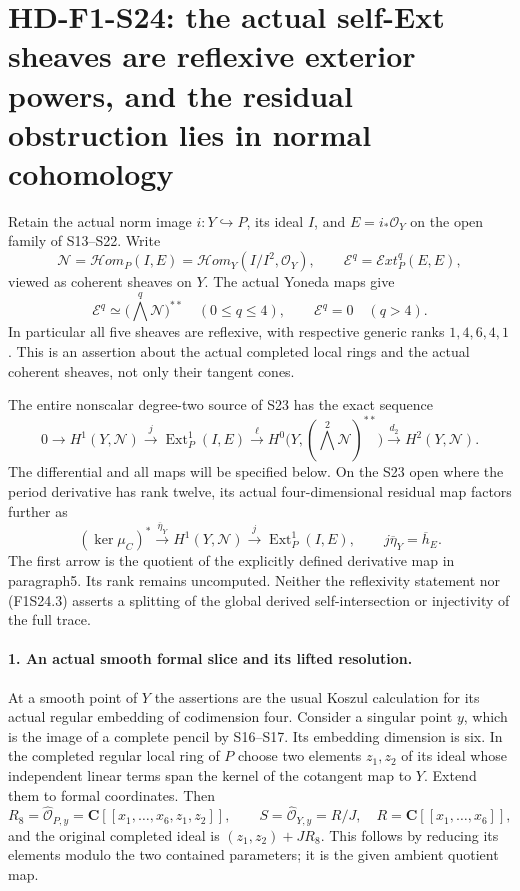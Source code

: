 \section[HD-F1-S24: reflexive local Ext and the actual normal obstruction]{HD-F1-S24: the actual self-Ext sheaves are reflexive exterior powers, and the residual obstruction lies in normal cohomology}
\label{sec:f1-norm-fourfold-reflexive-ext}

Retain the actual norm image $i:Y\hookrightarrow P$, its ideal $I$,
and $E=i_*\mathcal O_Y$ on the open family of S13--S22. Write
\[
 \mathscr N=\mathcal Hom_P(I,E)
       =\mathcal Hom_Y(I/I^2,\mathcal O_Y),\qquad
 \mathscr E^q=\mathcal Ext_P^q(E,E),
 \tag{F1S24.1}
\]
viewed as coherent sheaves on $Y$. The actual Yoneda maps give
\[
 \mathscr E^q\simeq\bigl(\textstyle\bigwedge^q\mathscr N\bigr)^{**}
       \quad(0\le q\le4),\qquad
 \mathscr E^q=0\quad(q>4).
 \tag{F1S24.2}
\]
In particular all five sheaves are reflexive, with respective generic
ranks $1,4,6,4,1$. This is an assertion about the actual completed
local rings and the actual coherent sheaves, not only their tangent
cones.

The entire nonscalar degree-two source of S23 has the exact sequence
\[
 0\longrightarrow H^1(Y,\mathscr N)
 \xrightarrow{j}\operatorname{Ext}^1_P(I,E)
 \xrightarrow{\ell}H^0\bigl(Y,(\bigwedge^2\mathscr N)^{**}\bigr)
 \xrightarrow{d_2}H^2(Y,\mathscr N).
 \tag{F1S24.3}
\]
The differential and all maps will be specified below. On the S23
open where the period derivative has rank twelve, its actual
four-dimensional residual map factors further as
\[
 (\ker\mu_C)^*\xrightarrow{\overline\eta_Y}H^1(Y,\mathscr N)
    \xrightarrow{j}\operatorname{Ext}^1_P(I,E),\qquad
                 j\overline\eta_Y=\overline h_E.
 \tag{F1S24.4}
\]
The first arrow is the quotient of the explicitly defined derivative
map in paragraph5. Its rank remains uncomputed. Neither the
reflexivity statement nor (F1S24.3) asserts a splitting of the global
derived self-intersection or injectivity of the full trace.

\paragraph{1. An actual smooth formal slice and its lifted resolution.}
At a smooth point of $Y$ the assertions are the usual Koszul
calculation for its actual regular embedding of codimension four.
Consider a singular point $y$, which is the image of a complete
pencil by S16--S17. Its embedding dimension is six. In the completed
regular local ring of $P$ choose two elements $z_1,z_2$ of its ideal
whose independent linear terms span the kernel of the cotangent
map to $Y$. Extend them to formal coordinates. Then
\[
 R_8=\widehat{\mathcal O}_{P,y}
      =\mathbf C[[x_1,\ldots,x_6,z_1,z_2]],\qquad
 S=\widehat{\mathcal O}_{Y,y}=R/J,
 \quad R=\mathbf C[[x_1,\ldots,x_6]],
 \tag{F1S24.5}
\]
and the original completed ideal is $(z_1,z_2)+JR_8$.
This follows by reducing its elements modulo the two contained
parameters; it is the given ambient quotient map.

